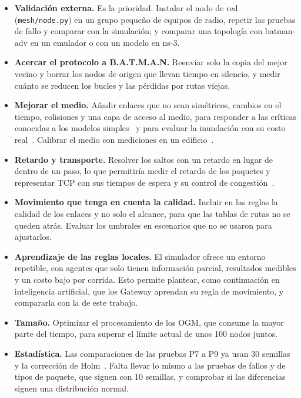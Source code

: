 \begin{itemize}
\item \textbf{Validación externa.} Es la prioridad. Instalar el nodo de red
(\texttt{mesh/node.py}) en un grupo pequeño de equipos de radio, repetir las
pruebas de fallo y comparar con la simulación; y comparar una topología con
batman-adv en un emulador o con un modelo en ns-3.
\item \textbf{Acercar el protocolo a B.A.T.M.A.N.} Reenviar solo la copia del
mejor vecino y borrar los nodos de origen que llevan tiempo en silencio, y
medir cuánto se reducen los bucles y las pérdidas por rutas viejas.
\item \textbf{Mejorar el medio.} Añadir enlaces que no sean simétricos, cambios
en el tiempo, colisiones y una capa de acceso al medio, para responder a las
críticas conocidas a los modelos simples~\cite{Kotz2004Assumptions} y para
evaluar la inundación con su costo real~\cite{Ni1999BroadcastStorm}. Calibrar
el medio con mediciones en un edificio~\cite{Seidel1992Multifloor}.
\item \textbf{Retardo y transporte.} Resolver los saltos con un retardo en
lugar de dentro de un paso, lo que permitiría medir el retardo de los paquetes
y representar TCP con sus tiempos de espera y su control de
congestión~\cite{Eddy2022TCP}.
\item \textbf{Movimiento que tenga en cuenta la calidad.} Incluir en las reglas
la calidad de los enlaces y no solo el alcance, para que las tablas de rutas no
se queden atrás. Evaluar los umbrales en escenarios que no se usaron para
ajustarlos.
\item \textbf{Aprendizaje de las reglas locales.} El simulador ofrece un
entorno repetible, con agentes que solo tienen información parcial, resultados
medibles y un costo bajo por corrida. Esto permite plantear, como continuación
en inteligencia artificial, que los Gateway aprendan su regla de movimiento, y
compararla con la de este trabajo.
\item \textbf{Tamaño.} Optimizar el procesamiento de los OGM, que consume la
mayor parte del tiempo, para superar el límite actual de unos 100 nodos juntos.
\item \textbf{Estadística.} Las comparaciones de las pruebas P7 a P9 ya usan
30 semillas y la corrección de Holm~\cite{Holm1979Sequential}. Falta llevar lo
mismo a las pruebas de fallos y de tipos de paquete, que siguen con 10
semillas, y comprobar si las diferencias siguen una distribución normal.
\end{itemize}
